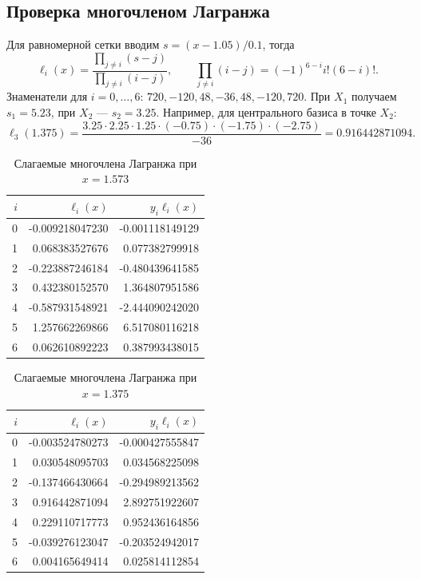 \documentclass[12pt,a4paper]{article}
\begin{document}
\subsection{Проверка многочленом Лагранжа}
Для равномерной сетки вводим $s=(x-1.05)/0.1$, тогда
\[
\ell_i(x)=\frac{\prod_{j\ne i}(s-j)}{\prod_{j\ne i}(i-j)},
\qquad \prod_{j\ne i}(i-j)=(-1)^{6-i}i!(6-i)!.
\]
Знаменатели для $i=0,\ldots,6$: $720,-120,48,-36,48,-120,720$.
При $X_1$ получаем $s_1=5.23$, при $X_2$ --- $s_2=3.25$.
Например, для центрального базиса в точке $X_2$:
\[
\ell_3(1.375)=\frac{3.25\cdot2.25\cdot1.25\cdot(-0.75)\cdot(-1.75)\cdot(-2.75)}{-36}
=0.916442871094.
\]
\begin{table}[H]
\centering
\caption{Слагаемые многочлена Лагранжа при $x=1.573$}
\begin{tabular}{rrr}
\toprule
$i$ & $\ell_i(x)$ & $y_i\ell_i(x)$ \\
\midrule
0 & -0.009218047230 & -0.001118149129 \\
1 & 0.068383527676 & 0.077382799918 \\
2 & -0.223887246184 & -0.480439641585 \\
3 & 0.432380152570 & 1.364807951586 \\
4 & -0.587931548921 & -2.444090242020 \\
5 & 1.257662269866 & 6.517080116218 \\
6 & 0.062610892223 & 0.387993438015 \\
\bottomrule
\end{tabular}
\end{table}

\begin{table}[H]
\centering
\caption{Слагаемые многочлена Лагранжа при $x=1.375$}
\begin{tabular}{rrr}
\toprule
$i$ & $\ell_i(x)$ & $y_i\ell_i(x)$ \\
\midrule
0 & -0.003524780273 & -0.000427555847 \\
1 & 0.030548095703 & 0.034568225098 \\
2 & -0.137466430664 & -0.294989213562 \\
3 & 0.916442871094 & 2.892751922607 \\
4 & 0.229110717773 & 0.952436164856 \\
5 & -0.039276123047 & -0.203524942017 \\
6 & 0.004165649414 & 0.025814112854 \\
\bottomrule
\end{tabular}
\end{table}
\end{document}

